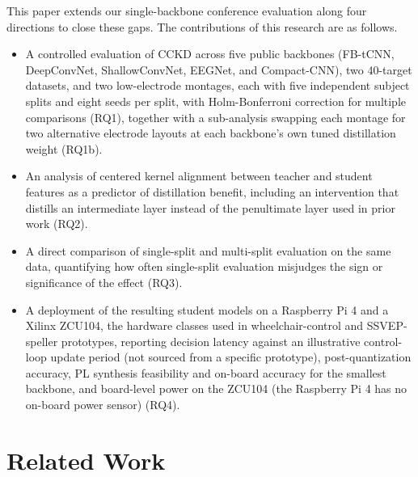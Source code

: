 \documentclass[11pt,a4paper,twoside,asymmetric]{article}
\begin{document}
This paper extends our single-backbone conference evaluation \cite{R82} along four directions to close these gaps. The contributions of this research are as follows.
\begin{itemize}
\item[(i)] A controlled evaluation of CCKD across five public backbones (FB-tCNN, DeepConvNet, ShallowConvNet, EEGNet, and Compact-CNN), two 40-target datasets, and two low-electrode montages, each with five independent subject splits and eight seeds per split, with Holm-Bonferroni correction for multiple comparisons (RQ1), together with a sub-analysis swapping each montage for two alternative electrode layouts at each backbone's own tuned distillation weight (RQ1b).
\item[(ii)] An analysis of centered kernel alignment between teacher and student features as a predictor of distillation benefit, including an intervention that distills an intermediate layer instead of the penultimate layer used in prior work (RQ2).
\item[(iii)] A direct comparison of single-split and multi-split evaluation on the same data, quantifying how often single-split evaluation misjudges the sign or significance of the effect (RQ3).
\item[(iv)] A deployment of the resulting student models on a Raspberry Pi 4 and a Xilinx ZCU104, the hardware classes used in wheelchair-control and SSVEP-speller prototypes, reporting decision latency against an illustrative control-loop update period (not sourced from a specific prototype), post-quantization accuracy, PL synthesis feasibility and on-board accuracy for the smallest backbone, and board-level power on the ZCU104 (the Raspberry Pi 4 has no on-board power sensor) (RQ4).
\end{itemize}

\section{Related Work}
\end{document}
